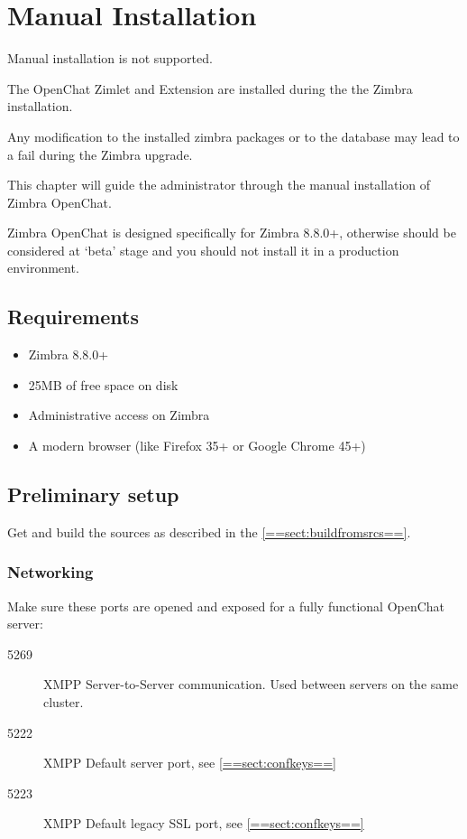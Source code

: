 \section{Manual Installation}

\begin{comment}
WARNING:
\end{comment}
\begin{warning}
    Manual installation is not supported.

    The OpenChat Zimlet and Extension are installed during the the Zimbra installation.

    Any modification to the installed zimbra packages or to the database may lead to a fail during the Zimbra upgrade.
\end{warning}

This chapter will guide the administrator through the manual installation of Zimbra OpenChat.

Zimbra OpenChat is designed specifically for Zimbra 8.8.0+, otherwise should be considered at `beta'
stage and you should not install it in a production environment.

\subsection{Requirements}
    \begin{itemize}
        \item Zimbra 8.8.0+
        \item 25MB of free space on disk
        \item Administrative access on Zimbra
        \item A modern browser (like Firefox 35+ or Google Chrome 45+)
    \end{itemize}

\subsection{Preliminary setup}

    Get and build the sources as described in the \ref{==sect:buildfromsrcs==}.

\subsubsection{Networking}

    Make sure these ports are opened and exposed for a fully functional OpenChat server:
    \begin{description}
        \item [5269] XMPP Server-to-Server communication. Used between servers on the same cluster.
        \item [5222] XMPP Default server port, see \ref{==sect:confkeys==}
        \item [5223] XMPP Default legacy SSL port, see \ref{==sect:confkeys==}
    \end{description}


